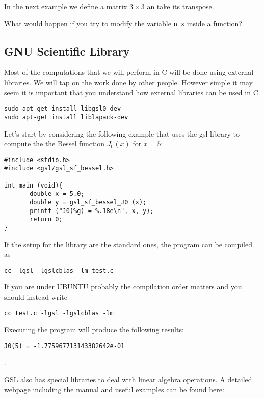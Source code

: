\documentclass{article}
\begin{document}
In the next example we define a matrix $3\times3$ an take its transpose.



What would happen if you try to modify the variable \verb"n_x" inside a function?

\subsection{GNU Scientific Library}

Most of the computations that we will perform in C will be done using
external libraries. We will tap on the work done by other
people. However simple it may seem it is important that you understand
how external libraries can be used in C.  

\begin{verbatim}
sudo apt-get install libgsl0-dev
sudo apt-get install liblapack-dev
\end{verbatim}

Let's start by considering the following example that uses the gsl library to compute the the Bessel function $J_{0}(x)$ for $x=5$:

\begin{verbatim}
#include <stdio.h>
#include <gsl/gsl_sf_bessel.h>
     
int main (void){
       double x = 5.0;
       double y = gsl_sf_bessel_J0 (x);
       printf ("J0(%g) = %.18e\n", x, y);
       return 0;
}
\end{verbatim}

If the setup for the library are the standard ones, the program can be compiled as

\begin{verbatim}
cc -lgsl -lgslcblas -lm test.c 
\end{verbatim}



If you are under UBUNTU probably the compilation order matters and you should instead write

\begin{verbatim}
cc test.c -lgsl -lgslcblas -lm 
\end{verbatim}

Executing the program will produce the following results:

\begin{verbatim}
J0(5) = -1.775967713143382642e-01
\end{verbatim}.


GSL also has special libraries to deal with linear algebra operations. A detailed webpage including the manual and useful examples can be found here:
\end{document}
